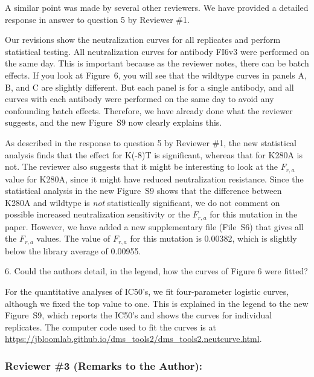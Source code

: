 \documentclass[11pt, oneside]{article}   	%
\begin{document}
{\color{black}
A similar point was made by several other reviewers.
We have provided a detailed response in answer to question 5 by Reviewer \#1.

Our revisions show the neutralization curves for all replicates and perform statistical testing.
All neutralization curves for antibody FI6v3 were performed on the same day.
This is important because as the reviewer notes, there can be batch effects.
If you look at Figure~6, you will see that the wildtype curves in panels A, B, and C are slightly different.
But each panel is for a single antibody, and all curves with each antibody were performed on the same day to avoid any confounding batch effects.
Therefore, we have already done what the reviewer suggests, and the new Figure~S9 now clearly explains this.

As described in the response to question 5 by Reviewer \#1, the new statistical analysis finds that the effect for K(-8)T is significant, whereas that for K280A is not.
The reviewer also suggests that it might be interesting to look at the $F_{r,a}$ value for K280A, since it might have reduced neutralization resistance.
Since the statistical analysis in the new Figure~S9 shows that the difference between K280A and wildtype is \emph{not} statistically significant, we do not comment on possible increased neutralization sensitivity or the $F_{r,a}$ for this mutation in the paper.
However, we have added a new supplementary file (File~S6) that gives all the $F_{r,a}$ values.
The value of $F_{r,a}$ for this mutation is 0.00382, which is slightly below the library average of 0.00955.
}

6. Could the authors detail, in the legend, how the curves of Figure 6 were fitted?

{\color{black}
For the quantitative analyses of IC50's, we fit four-parameter logistic curves, although we fixed the top value to one.
This is explained in the legend to the new Figure~S9, which reports the IC50's and shows the curves for individual replicates.
The computer code used to fit the curves is at \url{https://jbloomlab.github.io/dms_tools2/dms_tools2.neutcurve.html}.
}

\subsubsection*{Reviewer \#3 (Remarks to the Author):}
\end{document}
